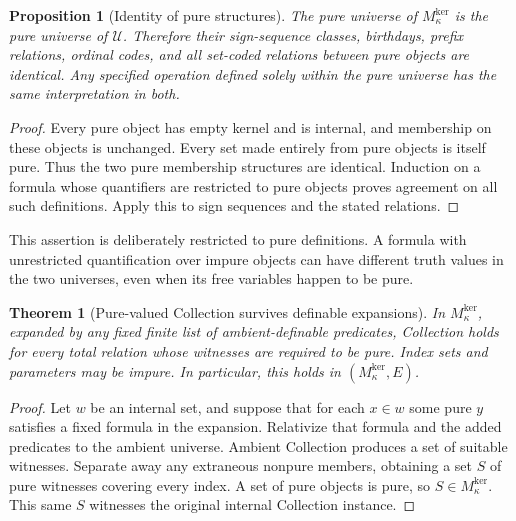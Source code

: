\documentclass[11pt,letterpaper]{article}
\newtheorem{theorem}{Theorem}[section]
\newtheorem{proposition}[proposition]{Proposition}\aliascntresetthe{proposition}
\theoremstyle{definition}
\theoremstyle{remark}
\newcommand{\Mker}{M^{\mathrm{ker}}}
\newcommand{\Uk}{\mathcal U}
\newcommand{\Act}{\mathsf{Act}}
\begin{document}
\begin{proposition}[Identity of pure structures]
\label{hset:zr:prop:pureidentity}
The pure universe of $\Mker_\kappa$ is the pure universe of $\Uk$. Therefore their sign-sequence classes, birthdays, prefix relations, ordinal codes, and all set-coded relations between pure objects are identical. Any specified operation defined solely within the pure universe has the same interpretation in both.
\end{proposition}
\begin{proof}
Every pure object has empty kernel and is internal, and membership on these objects is unchanged. Every set made entirely from pure objects is itself pure. Thus the two pure membership structures are identical. Induction on a formula whose quantifiers are restricted to pure objects proves agreement on all such definitions. Apply this to sign sequences and the stated relations.
\end{proof}

This assertion is deliberately restricted to pure definitions. A formula with unrestricted quantification over impure objects can have different truth values in the two universes, even when its free variables happen to be pure.

\begin{theorem}[Pure-valued Collection survives definable expansions]
\label{hset:zr:thm:purecollection}
In $\Mker_\kappa$, expanded by any fixed finite list of ambient-definable predicates, Collection holds for every total relation whose witnesses are required to be pure. Index sets and parameters may be impure. In particular, this holds in $(\Mker_\kappa,E)$.
\end{theorem}
\begin{proof}
Let $w$ be an internal set, and suppose that for each $x\in w$ some pure $y$ satisfies a fixed formula in the expansion. Relativize that formula and the added predicates to the ambient universe. Ambient Collection produces a set of suitable witnesses. Separate away any extraneous nonpure members, obtaining a set $S$ of pure witnesses covering every index. A set of pure objects is pure, so $S\in \Mker_\kappa$. This same $S$ witnesses the original internal Collection instance.
\end{proof}

\noindent[Added 4 October 2026, batch~90: source 12 (\cref{hset:ns:part})
proves, independently, the case $\kappa=\omega$ of this theorem for the graph
$\Act$ of a named action of a pure set-sized group on the atoms
(\cref{hset:ns:thm:purecollection}), by a second route: it bounds the least pure
ranks of witnesses by ambient Replacement and separates them from one pure
stage. With it, the identity of pure structures
(\cref{hset:zr:prop:pureidentity}), the surreal schemes and the no-go
corollary below extend to such actions and to the graded levels
$\mathsf R_k$ of Replacement for outputs with at most $k$ atoms
(\cref{hset:ns:prop:surrealinvariance,hset:ns:cor:surreal,hset:ns:cor:invisible};
\cref{hset:ns:rem:companion}).]
\end{document}
